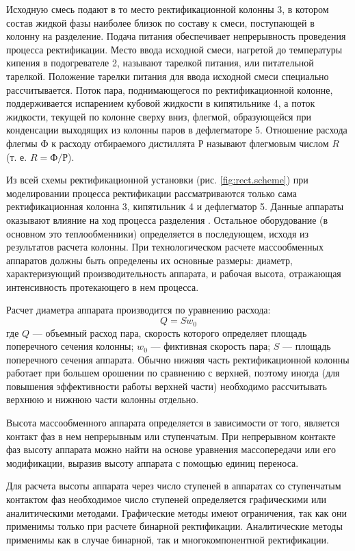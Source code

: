 Исходную смесь подают в то место ректификационной колонны 3, в котором состав жидкой фазы наиболее близок по составу к смеси, поступающей в колонну на разделение. Подача питания обеспечивает непрерывность проведения процесса ректификации. Место ввода исходной смеси, нагретой до температуры кипения в подогревателе 2, называют тарелкой питания, или питательной тарелкой. Положение тарелки питания для ввода исходной смеси специально рассчитывается. Поток пара, поднимающегося по ректификационной колонне, поддерживается испарением кубовой жидкости в кипятильнике 4, а поток жидкости, текущей по колонне сверху вниз, флегмой, образующейся при конденсации выходящих из колонны паров в дефлегматоре 5. Отношение расхода флегмы $Ф$ к расходу отбираемого дистиллята $Р$ называют флегмовым числом $R$ (т. е. $R = Ф/Р$).

Из всей схемы ректификационной установки (рис. \ref{fig:rect.scheme}) при моделировании процесса ректификации рассматриваются только сама ректификационная колонна 3, кипятильник 4 и дефлегматор 5. Данные аппараты оказывают влияние на ход процесса разделения \cite{klinov-mm2009}. Остальное оборудование (в основном это теплообменники) определяется в последующем, исходя из результатов расчета колонны. При технологическом расчете массообменных аппаратов должны быть определены их основные размеры: диаметр, характеризующий производительность аппарата, и рабочая высота, отражающая интенсивность протекающего в нем процесса.

Расчет диаметра аппарата производится по уравнению расхода:
\begin{equation}
	Q=S w_0
\end{equation}
где $Q$ --- объемный расход пара, скорость которого определяет площадь поперечного сечения колонны; $w_0$ --- фиктивная скорость пара; $S$ --- площадь поперечного сечения аппарата. Обычно нижняя часть ректификационной колонны работает при большем орошении по сравнению с верхней, поэтому иногда (для повышения эффективности работы верхней части) необходимо рассчитывать верхнюю и нижнюю части колонны отдельно.

Высота массообменного аппарата определяется в зависимости от того, является контакт фаз в нем непрерывным или ступенчатым. При непрерывном контакте фаз высоту аппарата можно найти на основе уравнения массопередачи или его модификации, выразив высоту аппарата с помощью единиц переноса.

Для расчета высоты аппарата через число ступеней в аппаратах со ступенчатым контактом фаз необходимое число ступеней определяется графическими или аналитическими методами. Графические методы имеют ограничения, так как они применимы только при расчете бинарной ректификации. Аналитические методы применимы как в случае бинарной, так и многокомпонентной ректификации.

